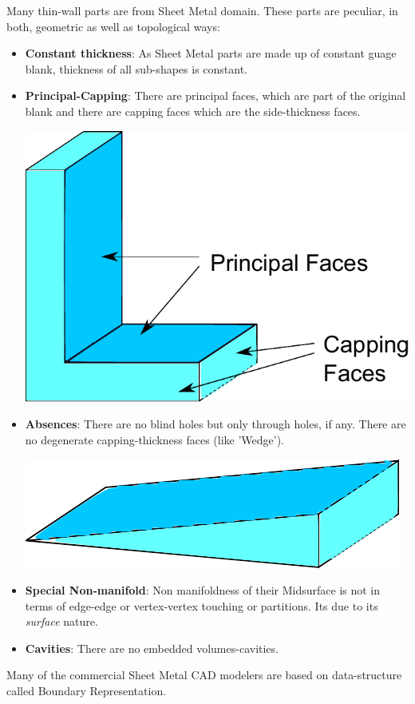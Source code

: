 Many thin-wall parts are from Sheet Metal domain. 
These parts are peculiar, in both, geometric as well as topological ways:
\begin{itemize}
[noitemsep,topsep=2pt,parsep=2pt,partopsep=2pt,leftmargin=*]
\item \textbf{Constant thickness}: As Sheet Metal parts are made up of constant guage blank, thickness of all sub-shapes is constant. 
\item \textbf{Principal-Capping}: There are principal faces, which are part of the original blank and there are capping faces which are the side-thickness faces.

\begin{center} \includegraphics[width=0.34\linewidth]{../Common/images/PrincipalCappingL.pdf}
\end{center}

\item \textbf{Absences}: There are no blind holes but only through holes, if any. There are no degenerate capping-thickness faces (like 'Wedge').
\begin{center} \includegraphics[width=0.34\linewidth]{../Common/images/WedgeTopology.pdf}
\end{center}
\item \textbf{Special Non-manifold}: Non manifoldness of their Midsurface is not in terms of edge-edge or vertex-vertex touching or partitions. Its due to its {\em surface} nature.
\item \textbf{Cavities}: There are no embedded volumes-cavities.
\end{itemize}


Many of the commercial Sheet Metal CAD modelers are based on data-structure called Boundary Representation.

